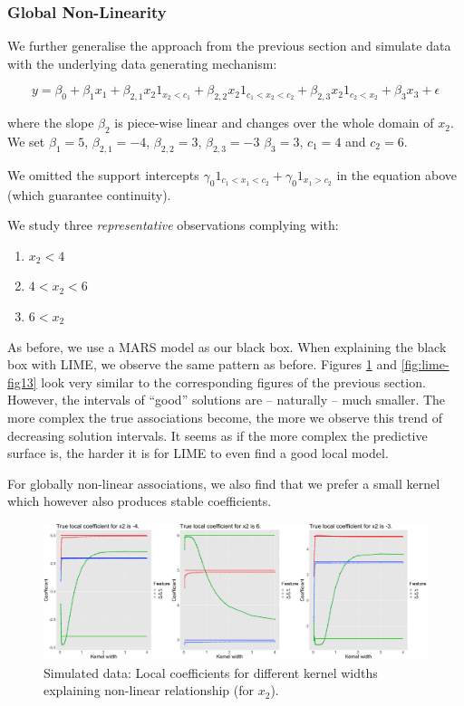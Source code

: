 \documentclass[
]{krantz}
\begin{document}
\hypertarget{id413}{%
\subsubsection{Global Non-Linearity}\label{id413}}

We further generalise the approach from the previous section and simulate data with the underlying data generating mechanism:

\[ y = \beta_0 + \beta_1 x_1 + \beta_{2,1} x_2 1_{x_2<c_1} + \beta_{2,2} x_2 1_{c_1 < x_2 < c_2} +  \beta_{2,3} x_2 1_{c_2 < x_2} + \beta_3 x_3 + \epsilon \]

where the slope \(\beta_2\) is piece-wise linear and changes over the whole domain of \(x_2\).
We set \(\beta_1 = 5\), \(\beta_{2,1} = -4\), \(\beta_{2,2} = 3\), \(\beta_{2,3} = -3\) \(\beta_3 = 3\), \(c_1 = 4\) and \(c_2 = 6\).

We omitted the support intercepts \(\gamma_0 1_{c_1 < x_1 < c_2} + \gamma_0 1_{x_1 > c_2}\) in the equation above (which guarantee continuity).

We study three \emph{representative} observations complying with:

\begin{enumerate}
\def\labelenumi{\arabic{enumi}.}
\item
  \(x_2 < 4\)
\item
  \(4 < x_2 < 6\)
\item
  \(6 < x_2\)
\end{enumerate}

As before, we use a MARS model as our black box.
When explaining the black box with LIME, we observe the same pattern as before.
Figures \ref{fig:lime-fig12} and \ref{fig:lime-fig13} look very similar to the corresponding figures of the previous section.
However, the intervals of ``good'' solutions are -- naturally -- much smaller.
The more complex the true associations become, the more we observe this trend of decreasing solution intervals.
It seems as if the more complex the predictive surface is, the harder it is for LIME to even find a good local model.

For globally non-linear associations, we also find that we prefer a small kernel which however also produces stable coefficients.

\begin{figure}

{\centering \includegraphics[width=0.99\linewidth]{images/04-09-12} 

}

\caption{Simulated data: Local coefficients for different kernel widths explaining non-linear relationship (for $x_2$).}\label{fig:lime-fig12}
\end{figure}
\end{document}
